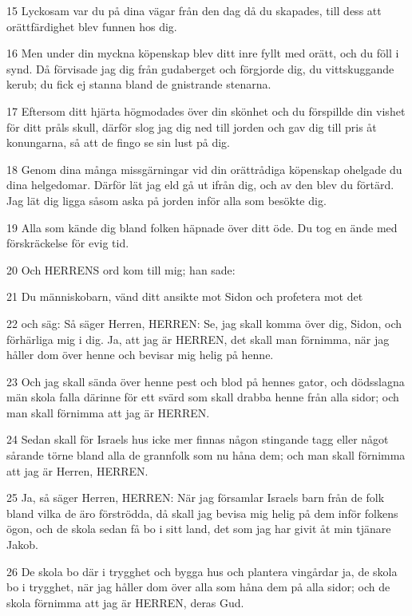 \par 15 Lyckosam var du på dina vägar från den dag då du skapades, till dess att orättfärdighet blev funnen hos dig.
\par 16 Men under din myckna köpenskap blev ditt inre fyllt med orätt, och du föll i synd. Då förvisade jag dig från gudaberget och förgjorde dig, du vittskuggande kerub; du fick ej stanna bland de gnistrande stenarna.
\par 17 Eftersom ditt hjärta högmodades över din skönhet och du förspillde din vishet för ditt pråls skull, därför slog jag dig ned till jorden och gav dig till pris åt konungarna, så att de fingo se sin lust på dig.
\par 18 Genom dina många missgärningar vid din orättrådiga köpenskap ohelgade du dina helgedomar. Därför lät jag eld gå ut ifrån dig, och av den blev du förtärd. Jag lät dig ligga såsom aska på jorden inför alla som besökte dig.
\par 19 Alla som kände dig bland folken häpnade över ditt öde. Du tog en ände med förskräckelse för evig tid.
\par 20 Och HERRENS ord kom till mig; han sade:
\par 21 Du människobarn, vänd ditt ansikte mot Sidon och profetera mot det
\par 22 och säg: Så säger Herren, HERREN: Se, jag skall komma över dig, Sidon, och förhärliga mig i dig. Ja, att jag är HERREN, det skall man förnimma, när jag håller dom över henne och bevisar mig helig på henne.
\par 23 Och jag skall sända över henne pest och blod på hennes gator, och dödsslagna män skola falla därinne för ett svärd som skall drabba henne från alla sidor; och man skall förnimma att jag är HERREN.
\par 24 Sedan skall för Israels hus icke mer finnas någon stingande tagg eller något sårande törne bland alla de grannfolk som nu håna dem; och man skall förnimma att jag är Herren, HERREN.
\par 25 Ja, så säger Herren, HERREN: När jag församlar Israels barn från de folk bland vilka de äro förströdda, då skall jag bevisa mig helig på dem inför folkens ögon, och de skola sedan få bo i sitt land, det som jag har givit åt min tjänare Jakob.
\par 26 De skola bo där i trygghet och bygga hus och plantera vingårdar ja, de skola bo i trygghet, när jag håller dom över alla som håna dem på alla sidor; och de skola förnimma att jag är HERREN, deras Gud.

